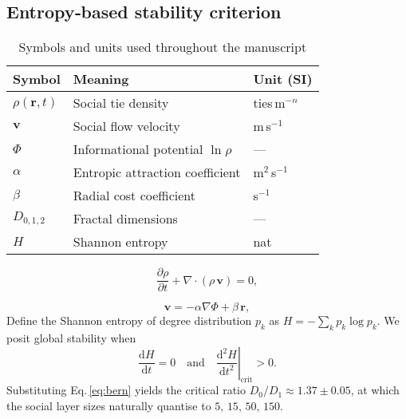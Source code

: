 \subsection{Entropy‑based stability criterion}\label{sec:entropy}
\begin{table}[h]
\caption{Symbols and units used throughout the manuscript}
\centering
\begin{tabular}{lll}
\hline
Symbol & Meaning & Unit (SI)\\\hline
$\rho(\mathbf{r},t)$ & Social tie density & ties\,m$^{-n}$\\
$\mathbf{v}$ & Social flow velocity & m\,s$^{-1}$\\
$\Phi$ & Informational potential $\ln\rho$ & —\\
$\alpha$ & Entropic attraction coefficient & m$^{2}$\,s$^{-1}$\\
$\beta$ & Radial cost coefficient & s$^{-1}$\\
$D_{0,1,2}$ & Fractal dimensions & —\\
$H$ & Shannon entropy & nat\\\hline
\end{tabular}
\label{tab:symbols}
\end{table}
\begin{equation}
\frac{\partial \rho}{\partial t} + \nabla\!\cdot\!(\rho\,\mathbf{v}) = 0 ,
\label{eq:continuity}
\end{equation}

\begin{equation}
\mathbf{v} = -\alpha \nabla \Phi + \beta\,\mathbf{r},
\label{eq:vfield}
\end{equation}
Define the Shannon entropy of degree distribution $p_{k}$ as
$H = -\sum_{k} p_{k}\log p_{k}$.
We posit global stability when
\begin{equation}
\frac{\mathrm{d}H}{\mathrm{d}t}=0
\quad\text{and}\quad
\left.\frac{\mathrm{d}^{2}H}{\mathrm{d}t^{2}}\right|_{\mathrm{crit}}>0 .
\end{equation}
Substituting Eq.\,\eqref{eq:bern} yields the critical ratio
$D_{0}/D_{1} \approx 1.37 \pm 0.05$,
at which the social layer sizes naturally quantise to
$5,\,15,\,50,\,150$.
